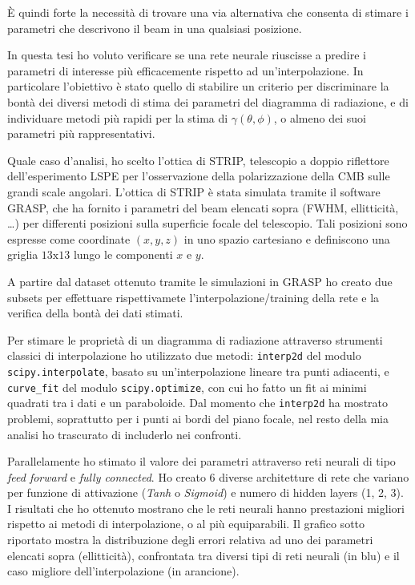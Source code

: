 \documentclass[12pt,a4paper,final]{report}			%
\begin{document}
\`E quindi forte la necessità di trovare una via alternativa che consenta di stimare i parametri che descrivono il beam in una qualsiasi posizione.

In questa tesi ho voluto verificare se una rete neurale riuscisse a predire i parametri di interesse più efficacemente rispetto ad un'interpolazione. In particolare l'obiettivo è stato quello di stabilire un criterio per discriminare la bontà dei diversi metodi di stima dei parametri del diagramma di radiazione, e di individuare metodi più rapidi per la stima di $\gamma(\theta, \phi)$, o almeno dei suoi parametri più rappresentativi.


Quale caso d'analisi, ho scelto l'ottica di STRIP, telescopio a doppio riflettore dell'esperimento LSPE per l'osservazione della polarizzazione della CMB sulle grandi scale angolari. L'ottica di STRIP è stata simulata tramite il software GRASP, che ha fornito i parametri del beam elencati sopra (FWHM, ellitticità, \ldots) per differenti posizioni sulla superficie focale del telescopio.
Tali posizioni sono espresse come coordinate $(x,y,z)$ in uno spazio cartesiano e definiscono una griglia $13\text{x}13$ lungo le componenti $x$ e $y$. 

A partire dal dataset ottenuto tramite le simulazioni in GRASP ho creato due subsets per effettuare rispettivamete l'interpolazione/training della rete e la verifica della bontà dei dati stimati.

Per stimare le proprietà di un diagramma di radiazione attraverso strumenti classici di interpolazione ho utilizzato due metodi: \texttt{interp2d} del modulo \texttt{scipy.interpolate}, basato su un'interpolazione lineare tra punti adiacenti, e \texttt{curve\_fit} del modulo \texttt{scipy.optimize}, con cui ho fatto un fit ai minimi quadrati tra i dati e un paraboloide. Dal momento che \texttt{interp2d} ha mostrato problemi, soprattutto per i punti ai bordi del piano focale, nel resto della mia analisi ho trascurato di includerlo nei confronti.


Parallelamente ho stimato il valore dei parametri attraverso reti neurali di tipo \textit{feed forward} e \textit{fully connected}.
Ho creato 6 diverse architetture di rete che variano per funzione di attivazione (\textit{Tanh} o \textit{Sigmoid}) e numero di hidden layers (1, 2, 3). 
I risultati che ho ottenuto mostrano che le reti neurali hanno prestazioni migliori rispetto ai metodi di interpolazione, o al più equiparabili.
Il grafico sotto riportato mostra la distribuzione degli errori relativa ad uno dei parametri elencati sopra (ellitticità), confrontata tra diversi tipi di reti neurali (in blu) e il caso migliore dell'interpolazione (in arancione).
\end{document}
